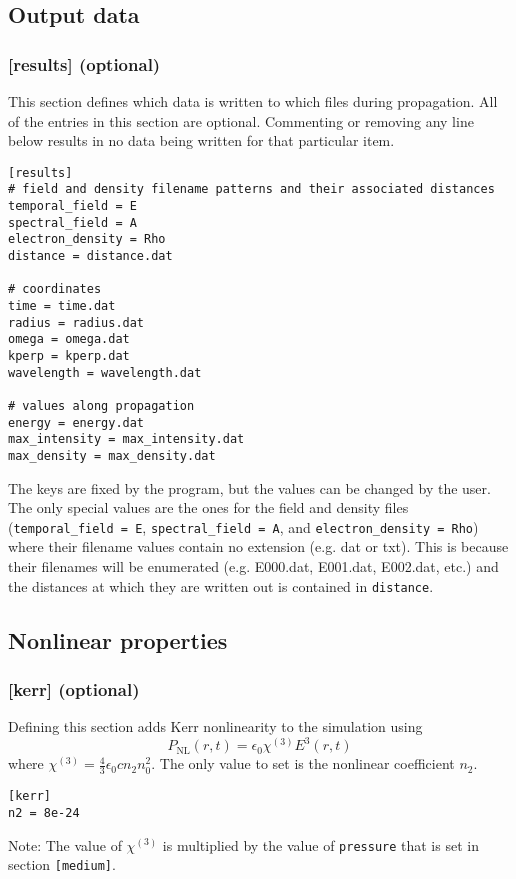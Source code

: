 \documentclass{article}
\begin{document}
\subsection{Output data}
\subsubsection{[results] (optional)}
This section defines which data is written to which files during
propagation.  All of the entries in this section are
optional. Commenting or removing any line below results in no data
being written for that particular item.
\begin{lstlisting}
[results]
# field and density filename patterns and their associated distances
temporal_field = E
spectral_field = A
electron_density = Rho
distance = distance.dat

# coordinates
time = time.dat
radius = radius.dat
omega = omega.dat
kperp = kperp.dat
wavelength = wavelength.dat

# values along propagation
energy = energy.dat
max_intensity = max_intensity.dat
max_density = max_density.dat
\end{lstlisting}

The keys are fixed by the program, but the values can be changed by
the user.  The only special values are the ones for the field and
density files (\texttt{temporal\_field = E}, \texttt{spectral\_field =
  A}, and \texttt{electron\_density = Rho}) where their filename values
contain no extension (e.g. dat or txt). This is because their
filenames will be enumerated (e.g. E000.dat, E001.dat, E002.dat, etc.)
and the distances at which they are written out is contained in
\texttt{distance}.

\subsection{Nonlinear properties}
\subsubsection{[kerr] (optional)}
Defining this section adds Kerr nonlinearity to the simulation using
\[P_{\mathrm{NL}}(r, t) = \epsilon_0 \chi^{(3)} E^3(r,t)\] where
$\chi^{(3)} = \frac43 \epsilon_0 c n_2 n_0^2$. The only value to set is the
nonlinear coefficient $n_2$.
\begin{lstlisting}
[kerr]
n2 = 8e-24
\end{lstlisting}
Note: The value of $\chi^{(3)}$ is multiplied by the value of
\texttt{pressure} that is set in section \texttt{[medium]}.
\end{document}
